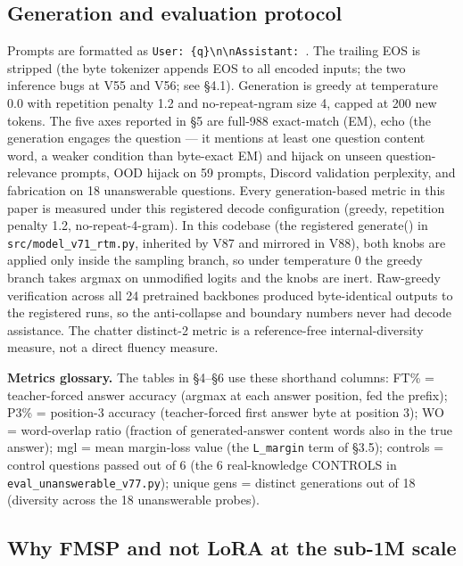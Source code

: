 \documentclass[11pt]{article}
\begin{document}
\subsection{Generation and evaluation protocol}

Prompts are formatted as \texttt{User: \{q\}\textbackslash n\textbackslash nAssistant: }. The trailing EOS is stripped (the byte tokenizer appends EOS to all encoded inputs; the two inference bugs at V55 and V56; see \S4.1). Generation is greedy at temperature 0.0 with repetition penalty 1.2 and no-repeat-ngram size 4, capped at 200 new tokens. The five axes reported in \S5 are full-988 exact-match (EM), echo (the generation engages the question --- it mentions at least one question content word, a weaker condition than byte-exact EM) and hijack on unseen question-relevance prompts, OOD hijack on 59 prompts, Discord validation perplexity, and fabrication on 18 unanswerable questions. Every generation-based metric in this paper is measured under this registered decode configuration (greedy, repetition penalty 1.2, no-repeat-4-gram). In this codebase (the registered generate() in \texttt{src/model\_v71\_rtm.py}, inherited by V87 and mirrored in V88), both knobs are applied only inside the sampling branch, so under temperature 0 the greedy branch takes argmax on unmodified logits and the knobs are inert. Raw-greedy verification across all 24 pretrained backbones produced byte-identical outputs to the registered runs, so the anti-collapse and boundary numbers never had decode assistance. The chatter distinct-2 metric is a reference-free internal-diversity measure, not a direct fluency measure.

\textbf{Metrics glossary.} The tables in \S4--\S6 use these shorthand columns: FT\% = teacher-forced answer accuracy (argmax at each answer position, fed the prefix); P3\% = position-3 accuracy (teacher-forced first answer byte at position 3); WO = word-overlap ratio (fraction of generated-answer content words also in the true answer); mgl = mean margin-loss value (the \texttt{L\_margin} term of \S3.5); controls = control questions passed out of 6 (the 6 real-knowledge CONTROLS in \texttt{eval\_unanswerable\_v77.py}); unique gens = distinct generations out of 18 (diversity across the 18 unanswerable probes).

\subsection{Why FMSP and not LoRA at the sub-1M scale}
\end{document}
